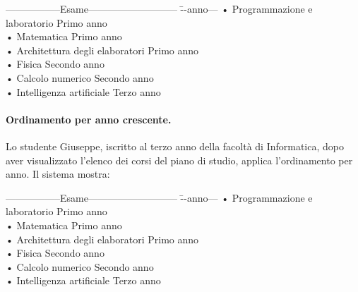 \begin{tabbing}
	\hspace{1cm}-----------------Esame--------------------------- \= --anno---\kill
	\hspace{1cm} • Programmazione e laboratorio \> Primo anno \\
	\hspace{1cm} • Matematica \> Primo anno \\
	\hspace{1cm} • Architettura degli elaboratori \> Primo anno \\
	\hspace{1cm} • Fisica \> Secondo anno \\
	\hspace{1cm} • Calcolo numerico \>Secondo anno \\
	\hspace{1cm} • Intelligenza artificiale	 \>Terzo anno \\
\end{tabbing}


\paragraph{Ordinamento per anno crescente.}
Lo studente Giuseppe, iscritto al terzo anno della facoltà di Informatica, dopo aver visualizzato l’elenco dei corsi del piano di studio, applica l’ordinamento per anno. Il sistema mostra:
	
\begin{tabbing}
	\hspace{1cm}-----------------Esame--------------------------- \= --anno---\kill
	\hspace{1cm} • Programmazione e laboratorio \> Primo anno \\
	\hspace{1cm} • Matematica \> Primo anno \\
	\hspace{1cm} • Architettura degli elaboratori \> Primo anno \\
	\hspace{1cm} • Fisica \> Secondo anno \\
	\hspace{1cm} • Calcolo numerico \>Secondo anno \\
	\hspace{1cm} • Intelligenza artificiale	 \>Terzo anno \\	
\end{tabbing}


